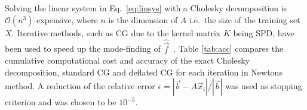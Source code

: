 \documentclass{article}
\begin{document}

Solving the linear system in Eq.~\eqref{eq:linsys} with a Cholesky decomposition is $\mathcal{O}(n^3)$ expensive, where $n$ is the dimension of $A$ i.e.~the size of the training set $X$. Iterative methods, such as CG due to the kernel matrix $K$ being SPD, have been used to speed up the mode-finding of $\hat{\vec{f}}$~\cite{RW-GPML,davies14}. Table \ref{tab:acc} compares the cumulative computational cost and accuracy of the exact Cholesky decomposition, standard CG and deflated CG for each iteration in Newtons method. A reduction of the relative error $\epsilon=|\vec{b}-A\vec{x}_i|/|\vec{b}|$ was used as stopping criterion and was chosen to be $10^{-5}$. 
\end{document}
